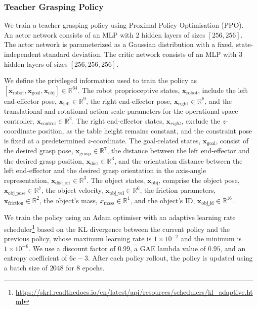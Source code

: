 \subsubsection{Teacher Grasping Policy}
\label{appendix:teacher_manipulation}
We train a teacher grasping policy using Proximal Policy Optimisation (PPO).
An actor network consists of an MLP with $2$ hidden layers of sizes $[256, 256]$.
The actor network is parameterized as a Gaussian distribution with a fixed, state-independent standard deviation.
The critic network consists of an MLP with $3$ hidden layers of sizes $[256, 256, 256]$.

We define the privileged information used to train the policy as $[\mathbf{x}_{\text{robot}}, \mathbf{x}_{\text{goal}}, \mathbf{x}_{\text{obj}}] \in \mathbb{R}^{64}$.
The robot proprioceptive states, $\mathbf{x}_{\text{robot}}$, include the left end-effector pose, $\mathbf{x}_{\text{left}} \in \mathbb{R}^{9}$, the right end-effector pose, $\mathbf{x}_{\text{right}} \in \mathbb{R}^{8}$, and the translational and rotational action scale parameters for the operational space controller, $\mathbf{x}_{\text{control}} \in \mathbb{R}^{2}$.
The right end-effector states, $\mathbf{x}_{right}$, exclude the $z$-coordinate position, as the table height remains constant, and the constraint pose is fixed at a predetermined $z$-coordinate.
The goal-related states, $\mathbf{x}_{\text{goal}}$, consist of the desired grasp pose, $\mathbf{x}_{\text{grasp}} \in \mathbb{R}^{7}$, the distance between the left end-effector and the desired grasp position, $\mathbf{x}_{\text{dist}} \in \mathbb{R}^{3}$, and the orientation distance between the left end-effector and the desired grasp orientation in the axis-angle representation, $\mathbf{x}_{\text{dist\_ori}} \in \mathbb{R}^{3}$.
The object states, $\mathbf{x}_{\text{obj}}$, comprise the object pose, $\mathbf{x}_{\text{obj\_pose}} \in \mathbb{R}^{7}$, the object velocity, $\mathbf{x}_{\text{obj\_vel}} \in \mathbb{R}^{6}$, the friction parameters, $\mathbf{x}_{\text{friction}} \in \mathbb{R}^{2}$, the object's mass, $x_{\text{mass}} \in \mathbb{R}^{1}$, and the object's ID, $\mathbf{x}_{\text{obj\_id}} \in \mathbb{R}^{16}$.

We train the policy using an Adam optimiser with an adaptive learning rate scheduler\footnote{\url{https://skrl.readthedocs.io/en/latest/api/resources/schedulers/kl_adaptive.html}} based on the KL divergence between the current policy and the previous policy, whose maximum learning rate is $1\times 10^{-2}$ and the minimum is $1\times 10^{-6}$.
We use a discount factor of $0.99$, a GAE lambda value of $0.95$, and an entropy coefficient of $6e-3$.
After each policy rollout, the policy is updated using a batch size of $2048$ for $8$ epochs.



